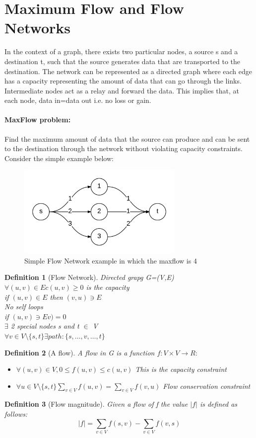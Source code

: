 \documentclass[12pt,letterpaper]{article}
\newtheorem{definition}{Definition}[section]
\begin{document}
\section{Maximum Flow and Flow Networks}
In the context of a graph, there exists two particular nodes, a source s and a destination t, such that the source generates data that are transported to the destination. The network can be represented as a directed graph where each edge has a capacity representing the amount of data that can go through the links. Intermediate nodes act as a relay and forward the data. This implies that, at each node, data in=data out i.e. no loss or gain. 
\paragraph{MaxFlow problem:} Find the maximum amount of data that the source can produce and can be sent to the destination through the network without violating capacity constraints. Consider the simple example below:
\begin{figure}[h]
\centering
\includegraphics[width=8cm]{mfsimple}
\caption{Simple Flow Network example in which the maxflow is 4}
\end{figure}
\begin{definition}[Flow Network]
Directed grapg G=(V,E)\\
$\forall (u,v)\in E c(u,v)\geq 0$ is the capacity\\
if $(u,v)\in E$ then $(v,u)\ni E$\\
No self loops\\
if $(u,v)\ni Ev)=0$\\
$\exists$ 2 special nodes s and t $\in$ V\\
$\forall v \in V\setminus \{s,t\} \exists path: \{s,\dots,v,\dots,t\}$ 
\end{definition}
\begin{definition}[A flow]
A flow in G is a function $f: V\times V\to R:$
\begin{itemize}
\item $\forall (u,v)\in V, 0\leq f(u,v)\leq c(u,v)$ This is the capacity constraint
\item $\forall u \in V\setminus\{s,t\} \sum_{v\in V}f(u,v)=\sum_{v\in V}f(v,u)$ Flow conservation constraint
\end{itemize} 
\end{definition}
\begin{definition}[Flow magnitude]
Given a flow of f the value $|f|$ is defined as follows:
\[|f|=\sum_{v\in V}f(s,v)-\sum_{v\in V}f(v,s)\]
\end{definition}
\end{document}
